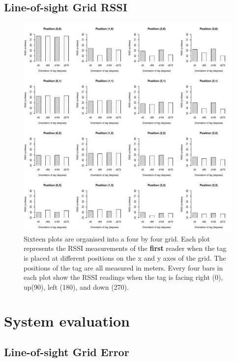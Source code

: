 \subsection{Line-of-sight Grid RSSI}

\begin{figure}[H]
	\begin{center}
		\includegraphics[width=1\textwidth]{figures/rssi_distance_grid_r1}
		\caption{Sixteen plots are organised into a four by four grid. Each plot represents the RSSI measurements of the \textbf{first} reader when the tag is placed at different positions on the x and y axes of the grid. The positions of the tag are all measured in meters. Every four bars in each plot show the RSSI readings when the tag is facing right (0\textdegree), up(90\textdegree), left (180\textdegree), and down (270\textdegree).}
	\end{center}
\end{figure}


\section{System evaluation}

\subsection{Line-of-sight Grid Error}

